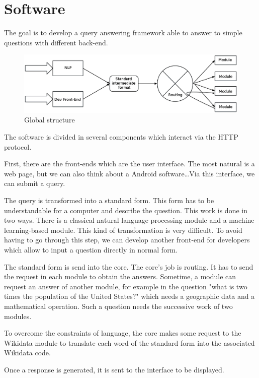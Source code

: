\documentclass[a4paper,10pt]{article}
\begin{document}
\section{Software}

The goal is to develop a query answering framework able to answer to simple questions with different back-end. 

\begin{figure}[!h]
    \centering
    \includegraphics[scale=0.39]{images/Structure-PPP-en.eps}
    \caption{Global structure}
\end{figure}

The software is divided in several components which interact via the HTTP protocol.

First, there are the front-ends which are the user interface. The most natural is a web page, but we can also think about a Android software\ldots Via this interface, we can submit a query.

The query is transformed into a standard form. This form has to be understandable for a computer and describe the question. This work is done in two ways. There is a classical natural language processing module and a machine learning-based module. This kind of transformation is very difficult. To avoid having to go through this step, we can develop another front-end for developers which allow to input a question directly in normal form.

The standard form is send into the core. The core's job is routing. It has to send the request in each module to obtain the answers. Sometime, a module can request an answer of another module, for example in the question "what is two times the population of the United States?" which needs a geographic data and a mathematical operation. Such a question needs the successive work of two modules.

To overcome the constraints of language, the core makes some request to the Wikidata module to translate each word of the standard form into the associated Wikidata code.

Once a response is generated, it is sent to the interface to be displayed.
\end{document}
